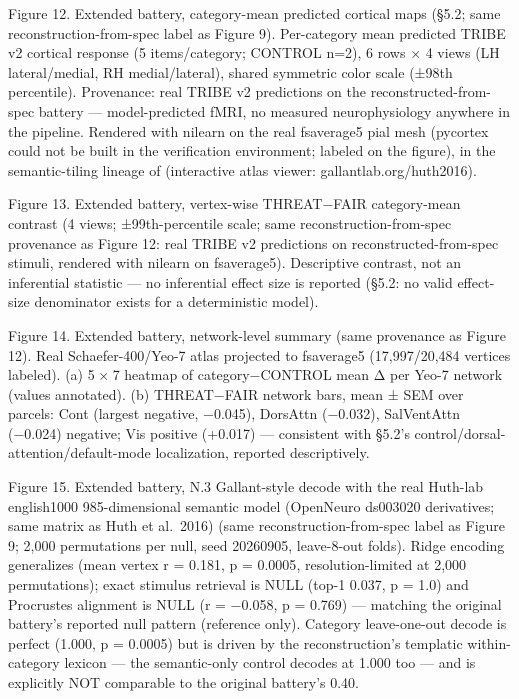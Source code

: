 \documentclass[
]{article}
\begin{document}
Figure 12. Extended battery, category-mean predicted cortical maps
(§5.2; same reconstruction-from-spec label as Figure 9). Per-category
mean predicted TRIBE v2 cortical response (5 items/category; CONTROL
n=2), 6 rows {×} 4 views (LH lateral/medial, RH medial/lateral), shared
symmetric color scale ({±}98th percentile). Provenance: real TRIBE v2
predictions on the reconstructed-from-spec battery --- model-predicted
fMRI, no measured neurophysiology anywhere in the pipeline. Rendered
with nilearn on the real fsaverage5 pial mesh (pycortex could not be
built in the verification environment; labeled on the figure), in the
semantic-tiling lineage of {} (interactive atlas viewer:
gallantlab.org/huth2016).

Figure 13. Extended battery, vertex-wise THREAT{−}FAIR category-mean
contrast (4 views; {±}99th-percentile scale; same
reconstruction-from-spec provenance as Figure 12: real TRIBE v2
predictions on reconstructed-from-spec stimuli, rendered with nilearn on
fsaverage5). Descriptive contrast, not an inferential statistic --- no
inferential effect size is reported (§5.2: no valid effect-size
denominator exists for a deterministic model).

Figure 14. Extended battery, network-level summary (same provenance as
Figure 12). Real Schaefer-400/Yeo-7 atlas projected to fsaverage5
(17{,}997/20{,}484 vertices labeled). (a) {5 × 7} heatmap of
category{−}CONTROL mean {Δ} per Yeo-7 network (values annotated). (b)
THREAT{−}FAIR network bars, mean {±} SEM over parcels: Cont (largest
negative, {−0.045}), DorsAttn ({−0.032}), SalVentAttn ({−0.024})
negative; Vis positive ({+0.017}) --- consistent with §5.2's
control/dorsal-attention/default-mode localization, reported
descriptively.

Figure 15. Extended battery, N.3 Gallant-style decode with the real
Huth-lab english1000 985-dimensional semantic model (OpenNeuro ds003020
derivatives; same matrix as Huth et al.~2016) (same
reconstruction-from-spec label as Figure 9; 2,000 permutations per null,
seed 20260905, leave-8-out folds). Ridge encoding generalizes (mean
vertex {r = 0.181}, {p = 0.0005}, resolution-limited at 2{,}000
permutations); exact stimulus retrieval is NULL (top-1 0.037, {p = 1.0})
and Procrustes alignment is NULL ({r = −0.058}, {p = 0.769}) ---
matching the original battery's reported null pattern (reference only).
Category leave-one-out decode is perfect (1.000, {p = 0.0005}) but is
driven by the reconstruction's templatic within-category lexicon --- the
semantic-only control decodes at 1.000 too --- and is explicitly NOT
comparable to the original battery's 0.40.
\end{document}
